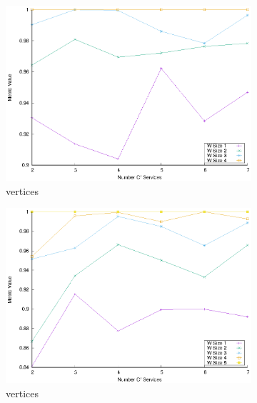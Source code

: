 \begin{figure}[!htb]
\begin{subfigure}{0.48\textwidth}
    \includegraphics[width=\textwidth]{Images/graphs/window_quality_performance_diff_perce_n7_s7_50_89_n4}
    \caption{ vertices}
    \label{fig:quality_window_average_perce_4n}
  \end{subfigure}
  \hfill
  \begin{subfigure}{0.48\textwidth}
    \includegraphics[width=\textwidth]{Images/graphs/window_quality_performance_diff_perce_n7_s7_50_89_n5}
    \caption{ vertices}
    \label{fig:quality_window_average_perce_5n}
  \end{subfigure}
  \hfill
  \begin{subfigure}{0.48\textwidth}

\end{subfigure}
\end{figure}
